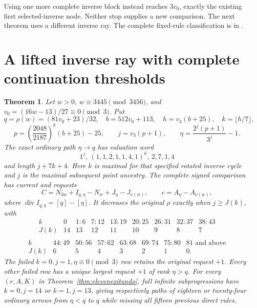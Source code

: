 \documentclass[11pt]{article}
\newtheorem{theorem}{Theorem}
\begin{document}
Using one more complete inverse block instead reaches $3v_0$, exactly
the existing first selected-inverse node. Neither stop supplies a new
comparison. The next theorem uses a different inverse ray. The complete
fixed-rule classification is in
.

\section{A lifted inverse ray with complete continuation thresholds}
\begin{theorem}\label{thm:liftedcycle}
Let $w>0$, $w\equiv3445\pmod{3456}$, and
$v_0=(16w-13)/27\equiv0\pmod3$. Put
\[
 q=\rho(w)=(81v_0+23)/32,\quad b=512v_0+113,\quad
 h=v_3(b+25),\quad k=\lfloor h/7\rfloor,
\]
\[
 p=\left(\frac{2048}{2187}\right)^k(b+25)-25,
 \qquad j=v_3(p+1),\qquad \eta=\frac{2^j(p+1)}{3^j}-1.
\]
The exact ordinary path $\eta\to q$ has valuation word
\[
 1^j,\ (1,1,2,1,1,4,1)^k,\ 2,7,1,4
\]
and length $j+7k+4$. Here $k$ is maximal for that specified rotated
inverse cycle and $j$ is the maximal subsequent point ancestry.
The complete signed comparison has current and requests
\[
 C=N_{3w}+I_{q,\eta}-N_w+J_\eta-J_{\nu(w)},\qquad
 c=A_\eta-A_{\nu(w)},
\]
where $\operatorname{div}I_{q,\eta}=[q]-[\eta]$.
It decreases the original $\rho$ exactly when $j\ge J(k)$, with
\[
\begin{array}{c|rrrrrrrr}
k&0&1\!:\!6&7\!:\!12&13\!:\!19&20\!:\!25&26\!:\!31&32\!:\!37&38\!:\!43\\
J(k)&14&13&12&11&10&9&8&7\\
\end{array}
\]
\[
\begin{array}{c|rrrrrrr}
k&44\!:\!49&50\!:\!56&57\!:\!62&63\!:\!68&69\!:\!74&75\!:\!80&81\text{ and above}\\
J(k)&6&5&4&3&2&1&0.
\end{array}
\]
The failed $k=0,j=1,\eta\equiv0\pmod3$ row retains the original
request $+1$. Every other failed row has a unique largest request $+1$
of rank $\eta>q$.
For every $(r,A,K)$ in Theorem~\ref{thm:elevenexitundo}, full infinite
subprogressions have $k=0,j=14$ or $k=1,j=13$, giving respectively
paths of eighteen or twenty-four ordinary arrows from $\eta<q$ to $q$ while
missing all fifteen previous direct rules.
\end{theorem}
\end{document}
